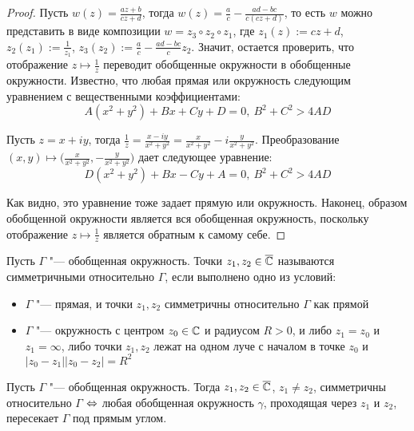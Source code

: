 \begin{proof}
	Пусть $w(z) = \frac{az + b}{cz + d}$, тогда $w(z) = \frac ac - \frac{ad - bc}{c(cz + d)}$, то есть $w$ можно представить в виде композиции $w = z_3 \circ z_2 \circ z_1$, где $z_1(z) := cz + d$, $z_2(z_1) := \frac 1{z_1}$, $z_3(z_2) := \frac ac - \frac{ ad - bc}c z_2$. Значит, остается проверить, что отображение $z \mapsto \frac 1z$ переводит обобщенные окружности в обобщенные окружности. Известно, что любая прямая или окружность следующим уравнением с вещественными коэффициентами:
	\[A(x^2 + y^2) + Bx + Cy + D = 0,~B^2 + C^2 > 4AD\]
	
	Пусть $z = x + iy$, тогда $\frac 1z = \frac{x - iy}{x^2 + y^2} = \frac{x}{x^2 + y^2} - i\frac{y}{x^2 + y^2}$. Преобразование $(x, y) \mapsto \big(\frac{x}{x^2 + y^2}, -\frac{y}{x^2 + y^2}\big)$ дает следующее уравнение:
	\[D(x^2 + y^2) + Bx - Cy + A = 0,~B^2 + C^2 > 4AD\]
	
	Как видно, это уравнение тоже задает прямую или окружность. Наконец, образом обобщенной окружности является вся обобщенная окружность, поскольку отображение $z \mapsto \frac 1z$ является обратным к самому себе.
\end{proof}

\begin{definition}
	Пусть $\Gamma$ "--- обобщенная окружность. Точки $z_1, z_2 \in \overline{\mathbb{C}}$ называются симметричными относительно $\Gamma$, если выполнено одно из условий:
	\begin{itemize}
		\item $\Gamma$ "--- прямая, и точки $z_1, z_2$ симметричны относительно $\Gamma$ как прямой
		\item $\Gamma$ "--- окружность с центром $z_0 \in \mathbb{C}$ и радиусом $R > 0$, и либо $z_1 = z_0$ и $z_1 = \infty$, либо точки $z_1, z_2$ лежат на одном луче с началом в точке $z_0$ и $|z_0 - z_1||z_0 - z_2| = R^2$
	\end{itemize}
\end{definition}

\begin{proposition}
	Пусть $\Gamma$ "--- обобщенная окружность. Тогда $z_1, z_2 \in \overline{\mathbb{C}}$, $z_1 \ne z_2$, симметричны относительно $\Gamma$ $\Leftrightarrow$ любая обобщенная окружность $\gamma$, проходящая через $z_1$ и $z_2$, пересекает $\Gamma$ под прямым углом.
\end{proposition}

